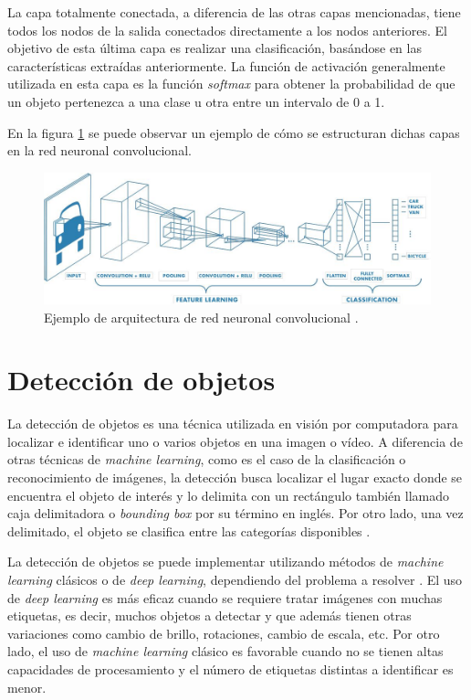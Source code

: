 La capa totalmente conectada, a diferencia de las otras capas mencionadas, tiene todos los nodos de la salida conectados directamente a los nodos anteriores. El objetivo de esta última capa es realizar una clasificación, basándose en las características extraídas anteriormente. La función de activación generalmente utilizada en esta capa es la función \textit{softmax} para obtener la probabilidad de que un objeto pertenezca a una clase u otra entre un intervalo de 0 a 1.

En la figura \ref{fig:cnn} se puede observar un ejemplo de cómo se estructuran dichas capas en la red neuronal convolucional.
\newpage

\begin{figure}[ht]
	\centering
	\includegraphics[scale=.35]{./Figures/cnn-image.jpeg}
	\caption{Ejemplo de arquitectura de red neuronal convolucional \protect\footnotemark.}
	\label{fig:cnn}
\end{figure}


\section{Detección de objetos}

La detección de objetos es una técnica utilizada en visión por computadora para localizar e identificar uno o varios objetos en una imagen o vídeo. A diferencia de otras técnicas de \textit{machine learning}, como es el caso de la clasificación o reconocimiento de imágenes, la detección busca localizar el lugar exacto donde se encuentra el objeto de interés y lo delimita con un rectángulo también llamado caja delimitadora o \textit{bounding box} por su término en inglés. Por otro lado, una vez delimitado, el objeto se clasifica entre las categorías disponibles \cite{WEBSITE:5}.

La detección de objetos se puede implementar utilizando métodos de \textit{machine learning} clásicos o de \textit{deep learning}, dependiendo del problema a resolver \cite{WEBSITE:6}. El uso de \textit{deep learning} es más eficaz cuando se requiere tratar imágenes con muchas etiquetas, es decir, muchos objetos a detectar y que además tienen otras variaciones como cambio de brillo, rotaciones, cambio de escala, etc. Por otro lado, el uso de \textit{machine learning} clásico es favorable cuando no se tienen altas capacidades de procesamiento y el número de etiquetas distintas a identificar es menor.

